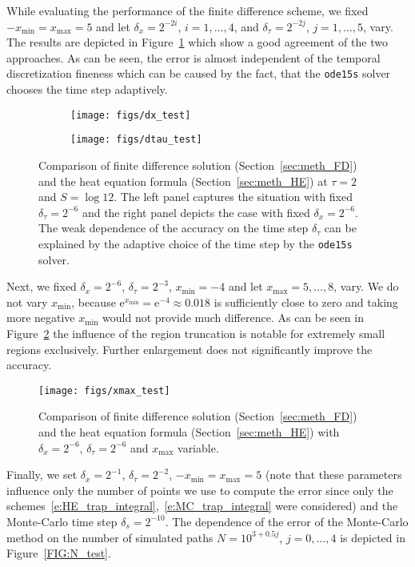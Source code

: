 \documentclass[a4paper,10pt]{article}
\newcommand{\e}{\mathrm{e}}
\newcommand{\1}{\mathbf{1}}
\begin{document}
{While evaluating the performance of the finite difference scheme, we fixed $-x_\mathrm{min} = x_\mathrm{max} = 5$ and let $\delta_x = 2^{-2i}$, $i=1, \ldots, 4$, and $\delta_\tau = 2^{-2j}$, $j=1, \ldots, 5$, vary. The results are depicted in Figure~\ref{FIG:dx_dtau_test} which show a good agreement of the two approaches. As can be seen, the error is almost independent of the temporal discretization fineness which can be caused by the fact, that the \texttt{ode15s} solver chooses the time step adaptively.
\begin{figure}[!ht]
\centering
\begin{subfigure}[b]{.48\textwidth}
\centering
\texttt{[image: figs/dx\_test]}
\end{subfigure}
\begin{subfigure}[b]{.48\textwidth}
\centering
\texttt{[image: figs/dtau\_test]}
\end{subfigure}
\caption{Comparison of finite difference solution (Section~\ref{sec:meth_FD}) and the heat equation formula (Section~\ref{sec:meth_HE}) at $\tau = 2$ and $S=\log 12$. The left panel captures the situation with fixed $\delta_\tau = 2^{-6}$ and the right panel depicts the case with fixed $\delta_x = 2^{-6}$. The weak dependence of the accuracy on the time step $\delta_\tau$ can be explained by the adaptive choice of the time step by the \texttt{ode15s} solver.} \label{FIG:dx_dtau_test}
\end{figure}

Next, we fixed $\delta_x = 2^{-6}$, $\delta_\tau = 2^{-3}$, $x_\mathrm{min} = -4$ and let $x_\mathrm{max} = 5, \ldots, 8$, vary. We do not vary $x_\mathrm{min}$, because $\e^{x_\mathrm{min}} = \e^{-4} \approx 0.018$ is sufficiently close to zero and taking more negative $x_\mathrm{min}$ would not provide much difference. As can be seen in Figure~\ref{FIG:xmax_test} the influence of the region truncation is notable for extremely small regions exclusively. Further enlargement does not significantly improve the accuracy. 

\begin{figure}[!ht]
\centering
\texttt{[image: figs/xmax\_test]}
\caption{Comparison of finite difference solution (Section~\ref{sec:meth_FD}) and the heat equation formula (Section~\ref{sec:meth_HE}) with $\delta_x=2^{-6}$, $\delta_\tau=2^{-6}$ and $x_\mathrm{max}$ variable.} \label{FIG:xmax_test}
\end{figure}

Finally, we set $\delta_x = 2^{-1}$, $\delta_\tau = 2^{-2}$, $-x_\mathrm{min} = x_\mathrm{max} = 5$ (note that these parameters influence only the number of points we use to compute the error since only the schemes~\eqref{e:HE_trap_integral},~\eqref{e:MC_trap_integral} were considered) and the Monte-Carlo time step $\delta_s = 2^{-10}$. The dependence of the error of the Monte-Carlo method on the number of simulated paths $N=10^{3+0.5j}$, $j = 0, \ldots, 4$ is depicted in Figure~\ref{FIG:N_test}.

}
\end{document}
